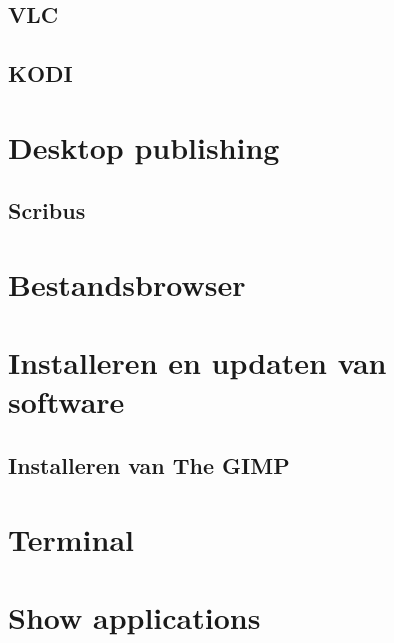 \documentclass[a4paper,12pt,twoside,openright,titlepage]{book}
\begin{document}
\subsection{VLC}

\subsection{KODI}

\section{Desktop publishing}
\subsection{Scribus}

\section{Bestandsbrowser}

\section{Installeren en updaten van software}

\subsection{Installeren van The GIMP}

\section{Terminal}

\section{Show applications}


\backmatter
\printindex
\end{document}
